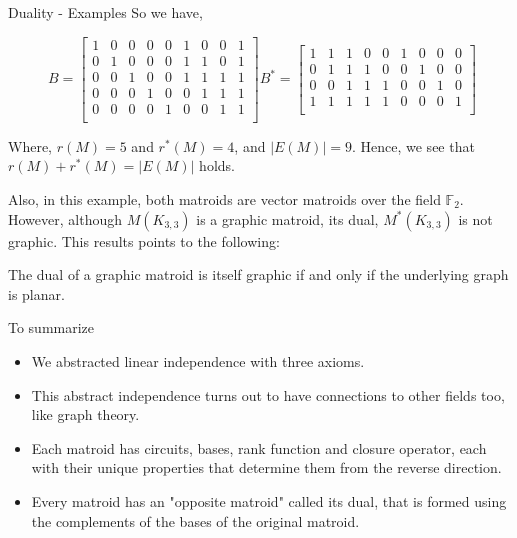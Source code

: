\documentclass{beamer}
\begin{document}
\begin{frame}{Duality - Examples}
    So we have, 
\begin{figure}
        $$B=\!\!\!\begin{bmatrix}
    1 & 0 & 0 & 0 & 0 & 1 & 0 & 0 & 1\\
    0 & 1 & 0 & 0 & 0 & 1 & 1 & 0 & 1\\
    0 & 0 & 1 & 0 & 0 & 1 & 1 & 1 & 1\\
    0 & 0 & 0 & 1 & 0 & 0 & 1 & 1 & 1\\
    0 & 0 & 0 & 0 & 1 & 0 & 0 & 1 & 1\\
    \end{bmatrix}
  B^*=\!\!\!\begin{bmatrix} 
1 & 1 & 1 & 0 & 0 & 1 & 0 & 0 & 0\\
0 & 1 & 1 & 1 & 0 & 0 & 1 & 0 & 0\\
0 & 0 & 1 & 1 & 1 & 0 & 0 & 1 & 0\\
1 & 1 & 1 & 1 & 1 & 0 & 0 & 0 & 1\\
\end{bmatrix}$$
\end{figure}
\pause
Where, $r(M) = 5$ and $r^*(M)=4$, and $|E(M)|=9$.
Hence, we see that $r(M) + r^*(M) = |E(M)|$ holds.

\pause Also, in this example, both matroids are vector matroids over the field $\mathbb{F}_2$. 
\pause However, although $M(K_{3,3})$ is a graphic matroid, its dual, $M^*(K_{3,3})$ is not graphic. This results points to the following: \pause
\begin{theorem}
    \item  The dual of a graphic matroid is itself graphic if and only if the underlying graph is planar.
\end{theorem}

\end{frame}

\begin{frame}{To summarize}
\pause
\begin{itemize}[<+->]
    \item We abstracted linear independence with three axioms.
    \item This abstract independence turns out to have connections to other fields too, like graph theory.
    \item Each matroid has circuits, bases, rank function and closure operator, each with their unique properties that determine them from the reverse direction.
    \item Every matroid has an "opposite matroid" called its dual, that is formed using the complements of the bases of the original matroid.
\end{itemize}

\end{frame}
\end{document}
